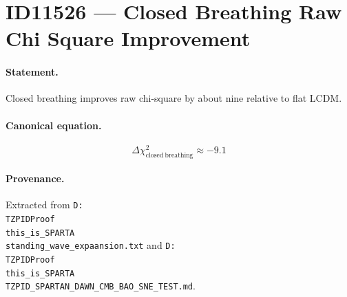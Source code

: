 \section*{ID11526 --- Closed Breathing Raw Chi Square Improvement}

\paragraph{Statement.}
Closed breathing improves raw chi-square by about nine relative to flat LCDM.

\paragraph{Canonical equation.}
\[
\Delta\chi^2_{\mathrm{closed\ breathing}}\approx-9.1
\]

\paragraph{Provenance.}
Extracted from \texttt{D:\\TZPIDProof\\this\_is\_SPARTA\\standing\_wave\_expaansion.txt} and \texttt{D:\\TZPIDProof\\this\_is\_SPARTA\\TZPID\_SPARTAN\_DAWN\_CMB\_BAO\_SNE\_TEST.md}.
